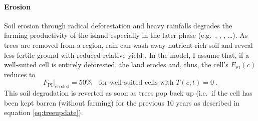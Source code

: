 
\paragraph{Erosion}
Soil erosion through radical deforestation and heavy rainfalls degrades the farming productivity of the island especially in the later phase (e.g.\ \citet{Brander1998}, \citet{Mieth2005}, \citet{Bahn2017}, \ldots).
As trees are removed from a region, rain can wash away nutrient-rich soil and reveal less fertile ground with reduced relative yield \citet{Mieth2005}.
In the model, I assume that, if a well-suited cell is entirely deforested, the land erodes and, thus, the cell's $F_\text{PI}(c)$ reduces to 
\begin{equation}
F_\text{PI}|_\text{eroded}=50\% \quad \text{for well-suited cells with } T(c,t)=0 \ .
\end{equation}
This soil degradation is reverted as soon as trees pop back up (i.e.\ if the cell has been kept barren (without farming) for the previous $10$ years as described in equation \ref{eq:treeupdate}).


